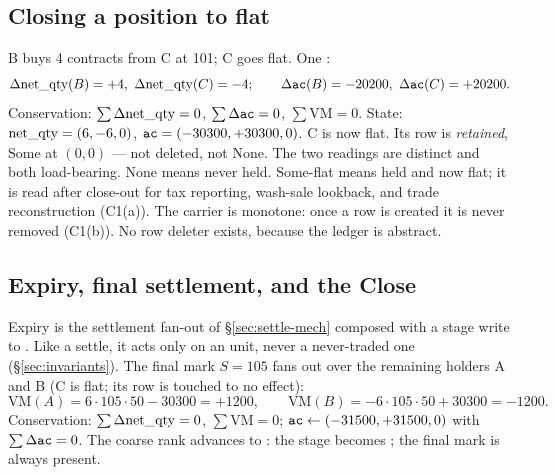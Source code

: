 \subsection{Closing a position to flat}
\label{sec:close}

B buys 4 contracts from C at 101; C goes flat. One :
\[
\Delta\mathrm{net\_qty}(B)=+4,\ \Delta\mathrm{net\_qty}(C)=-4;\qquad \Delta\texttt{ac}(B)=-20200,\ \Delta\texttt{ac}(C)=+20200.
\]
Conservation: $\sum\Delta\mathrm{net\_qty}=0$, $\sum\Delta\texttt{ac}=0$, $\sum\mathrm{VM}=0$. State: $\mathrm{net\_qty}=(6,-6,0)$,
$\texttt{ac}=(-30300,+30300,0)$. C is now flat. Its row is \emph{retained}, $\mathrm{Some}$ at $(0,0)$ --- not
deleted, not $\mathrm{None}$. The two readings are distinct and both load-bearing. $\mathrm{None}$
means never held. $\mathrm{Some}$-flat means held and now flat; it is read after close-out for tax
reporting, wash-sale lookback, and trade reconstruction (C1(a)). The carrier is monotone: once a row
is created it is never removed (C1(b)). No row deleter exists, because the ledger is abstract.

\subsection{Expiry, final settlement, and the Close}

Expiry is the settlement fan-out of \S\ref{sec:settle-mech} composed with a stage write to
. Like a settle, it acts only on an  unit, never a never-traded one
(\S\ref{sec:invariants}). The final mark $S=105$ fans out over the remaining holders A and B (C is
flat; its row is touched to no effect):
\[
\mathrm{VM}(A) = 6\cdot 105\cdot 50 - 30300 = +1200,\qquad
\mathrm{VM}(B) = -6\cdot 105\cdot 50 + 30300 = -1200.
\]
Conservation: $\sum\Delta\mathrm{net\_qty}=0$, $\sum\mathrm{VM}=0$; $\texttt{ac}\leftarrow(-31500,+31500,0)$ with
$\sum\Delta\texttt{ac}=0$. The coarse rank advances to : the stage becomes
; the final mark is always present.

